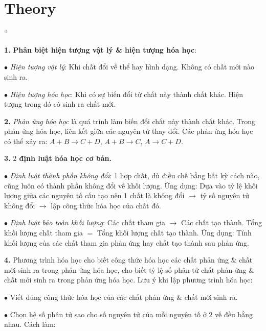 \documentclass{article}
\numberwithin{equation}{section}
\begin{document}
\section*{Theory}
``\begin{enumerate*}
	\item[\textbf{1.}] \textbf{Phân biệt hiện tượng vật lý \& hiện tượng hóa học}:
	\begin{enumerate*}
		\item[$\bullet$] \textit{Hiện tượng vật lý}: Khi chất đổi về thể hay hình dạng. Không có chất mới nào sinh ra.
		\item[$\bullet$] \textit{Hiện tượng hóa học}: Khi có sự biến đổi từ chất này thành chất khác. Hiện tượng trong đó có sinh ra chất mới.
	\end{enumerate*}
	\item[\textbf{2.}] \textit{Phản ứng hóa học} là quá trình làm biến đổi chất này thành chất khác. Trong phản ứng hóa học, liên kết giữa các nguyên tử thay đổi. Các phản ứng hóa học có thể xảy ra: $A + B\to C + D$, $A + B\to C$, $A\to C + D$.
	\item[\textbf{3.}] \textbf{$2$ định luật hóa học cơ bản.}
	\begin{enumerate*}
		\item[$\bullet$] \textit{Định luật thành phần không đổi}: 1 hợp chất, dù điều chế bằng bất kỳ cách nào, cũng luôn có thành phần không đổi về khối lượng. Ứng dụng: Dựa vào tỷ lệ khối lượng giữa các nguyên tố cấu tạo nên 1 chất là không đổi $\to$ tỷ số nguyên tử không đổi $\to$ lập công thức hóa học của chất đó.
		\item[$\bullet$] \textit{Định luật bảo toàn khối lượng}: Các chất tham gia $\to$ Các chất tạo thành. Tổng khối lượng chất tham gia $=$ Tổng khối lượng chất tạo thành. Ứng dụng: Tính khối lượng của các chất tham gia phản ứng hay chất tạo thành sau phản ứng.
	\end{enumerate*}
	\item[\textbf{4.}] Phương trình hóa học cho biết công thức hóa học các chất phản ứng \& chất mới sinh ra trong phản ứng hóa học, cho biết tỷ lệ số phân tử chất phản ứng \& chất mới sinh ra trong phản ứng hóa học. Lưu ý khi lập phương trình hóa học:
	\begin{enumerate*}
		\item[$\bullet$] Viết đúng công thức hóa học của các chất phản ứng \& chất mới sinh ra.
		\item[$\bullet$] Chọn hệ số phân tử sao cho số nguyên tử của mỗi nguyên tố ở 2 vế đều bằng nhau. Cách làm:
		\begin{enumerate*}

\end{enumerate*}
\end{enumerate*}
\end{enumerate*}
\end{document}
